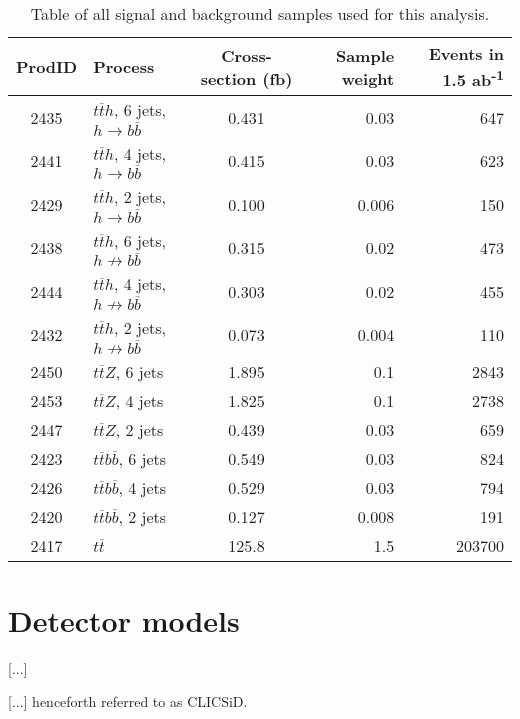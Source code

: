 \begin{table}[htp]
\centering
	\begin{tabular}{ c l c r r }
	\hline \hline
	ProdID & Process & Cross-section (fb) & Sample weight & Events in 1.5 ab\textsuperscript{-1} \\ \hline \hline
	2435 & $t\overline{t}h$, 6 jets, $h \rightarrow b\overline{b}$ & 0.431 & 0.03 & 647 \\
	2441 & $t\overline{t}h$, 4 jets, $h \rightarrow b\overline{b}$ & 0.415 & 0.03 & 623 \\ \hline
	2429 & $t\overline{t}h$, 2 jets, $h \rightarrow b\overline{b}$ & 0.100 & 0.006 & 150 \\

	2438 & $t\overline{t}h$, 6 jets, $h \not\rightarrow b\overline{b}$ & 0.315 & 0.02 & 473	 \\
	2444 & $t\overline{t}h$, 4 jets, $h \not\rightarrow b\overline{b}$ & 0.303 & 0.02 & 455 \\
	2432 & $t\overline{t}h$, 2 jets, $h \not\rightarrow b\overline{b}$ & 0.073 & 0.004 & 110 \\

	2450 & $t\overline{t}Z$, 6 jets & 1.895 & 0.1 & 2843 \\
	2453 & $t\overline{t}Z$, 4 jets & 1.825 & 0.1 & 2738 \\
	2447 & $t\overline{t}Z$, 2 jets & 0.439 & 0.03 & 659 \\
	
	2423 & $t\overline{t}b\overline{b}$, 6 jets & 0.549 & 0.03 & 824 \\
	2426 & $t\overline{t}b\overline{b}$, 4 jets & 0.529 & 0.03 & 794 \\
	2420 & $t\overline{t}b\overline{b}$, 2 jets & 0.127 & 0.008 & 191 \\

	2417 & $t\overline{t}$ & 125.8 & 1.5 & 203700 \\ \hline

	\end{tabular}
	\caption{Table of all signal and background samples used for this analysis.}
	\label{table:physics/SM/generatedsamples}
\end{table}

\section{Detector models}
[...]

[...] henceforth referred to as CLIC\textunderscore SiD.


